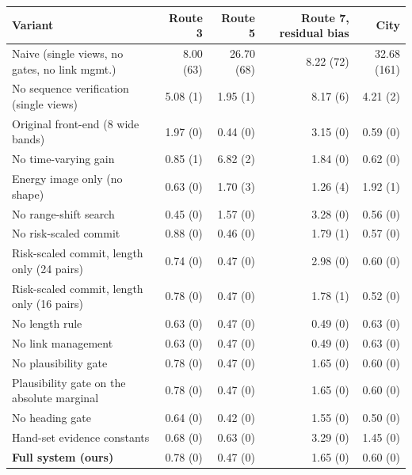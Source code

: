 \begin{tabular}{lrrrr}
\toprule
Variant & Route 3 & Route 5 & Route 7, residual bias & City \\
\midrule
Naive (single views, no gates, no link mgmt.) & 8.00 (63) & 26.70 (68) & 8.22 (72) & 32.68 (161) \\
No sequence verification (single views) & 5.08 (1) & 1.95 (1) & 8.17 (6) & 4.21 (2) \\
Original front-end (8 wide bands) & 1.97 (0) & 0.44 (0) & 3.15 (0) & 0.59 (0) \\
No time-varying gain & 0.85 (1) & 6.82 (2) & 1.84 (0) & 0.62 (0) \\
Energy image only (no shape) & 0.63 (0) & 1.70 (3) & 1.26 (4) & 1.92 (1) \\
No range-shift search & 0.45 (0) & 1.57 (0) & 3.28 (0) & 0.56 (0) \\
No risk-scaled commit & 0.88 (0) & 0.46 (0) & 1.79 (1) & 0.57 (0) \\
Risk-scaled commit, length only (24 pairs) & 0.74 (0) & 0.47 (0) & 2.98 (0) & 0.60 (0) \\
Risk-scaled commit, length only (16 pairs) & 0.78 (0) & 0.47 (0) & 1.78 (1) & 0.52 (0) \\
No length rule & 0.63 (0) & 0.47 (0) & 0.49 (0) & 0.63 (0) \\
No link management & 0.63 (0) & 0.47 (0) & 0.49 (0) & 0.63 (0) \\
No plausibility gate & 0.78 (0) & 0.47 (0) & 1.65 (0) & 0.60 (0) \\
Plausibility gate on the absolute marginal & 0.78 (0) & 0.47 (0) & 1.65 (0) & 0.60 (0) \\
No heading gate & 0.64 (0) & 0.42 (0) & 1.55 (0) & 0.50 (0) \\
Hand-set evidence constants & 0.68 (0) & 0.63 (0) & 3.29 (0) & 1.45 (0) \\
\midrule
\textbf{Full system (ours)} & 0.78 (0) & 0.47 (0) & 1.65 (0) & 0.60 (0) \\
\bottomrule
\end{tabular}
